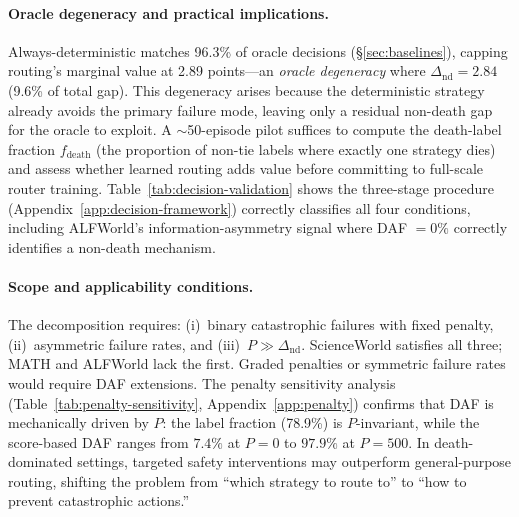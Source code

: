 \paragraph{Oracle degeneracy and practical implications.}
Always-deterministic matches 96.3\% of oracle decisions (\S\ref{sec:baselines}), capping routing's marginal value at 2.89 points---an \emph{oracle degeneracy} where $\Delta_{\text{nd}} = 2.84$ (9.6\% of total gap). This degeneracy arises because the deterministic strategy already avoids the primary failure mode, leaving only a residual non-death gap for the oracle to exploit. A ${\sim}$50-episode pilot suffices to compute the death-label fraction $f_{\text{death}}$ (the proportion of non-tie labels where exactly one strategy dies) and assess whether learned routing adds value before committing to full-scale router training. Table~\ref{tab:decision-validation} shows the three-stage procedure (Appendix~\ref{app:decision-framework}) correctly classifies all four conditions, including ALFWorld's information-asymmetry signal where DAF $= 0\%$ correctly identifies a non-death mechanism.

\begin{table}[t]
\centering
\scriptsize
{}
\caption{Retrospective validation of the practitioner decision framework. SW = ScienceWorld. The three-stage diagnostic correctly classifies all four conditions (4/4).}
\label{tab:decision-validation}
\end{table}

\paragraph{Scope and applicability conditions.}
The decomposition requires: (i)~binary catastrophic failures with fixed penalty, (ii)~asymmetric failure rates, and (iii)~$P \gg \Delta_\text{nd}$. ScienceWorld satisfies all three; MATH and ALFWorld lack the first. Graded penalties or symmetric failure rates would require DAF extensions. The penalty sensitivity analysis (Table~\ref{tab:penalty-sensitivity}, Appendix~\ref{app:penalty}) confirms that DAF is mechanically driven by $P$: the label fraction (78.9\%) is $P$-invariant, while the score-based DAF ranges from $7.4\%$ at $P{=}0$ to $97.9\%$ at $P{=}500$. In death-dominated settings, targeted safety interventions may outperform general-purpose routing, shifting the problem from ``which strategy to route to'' to ``how to prevent catastrophic actions.''

